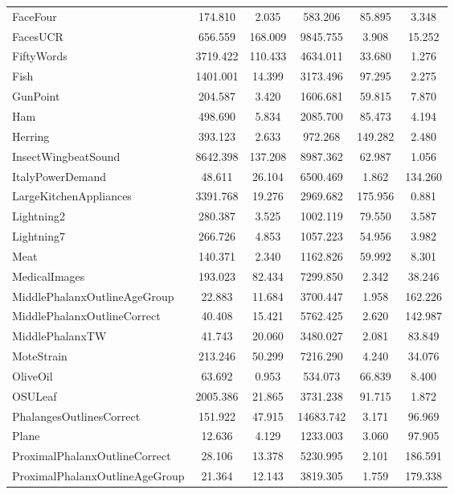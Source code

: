 \begin{table}[ht]
\begin{adjustbox}{width=0.7\textwidth,center}
\begin{tabular}{lccccc}
        FaceFour & 174.810 & 2.035 & 583.206 & 85.895 & 3.348 \\
        FacesUCR & 656.559 & 168.009 & 9845.755 & 3.908 & 15.252 \\
        FiftyWords & 3719.422 & 110.433 & 4634.011 & 33.680 & 1.276 \\
        Fish & 1401.001 & 14.399 & 3173.496 & 97.295 & 2.275 \\
        GunPoint & 204.587 & 3.420 & 1606.681 & 59.815 & 7.870 \\
        Ham & 498.690 & 5.834 & 2085.700 & 85.473 & 4.194 \\
        Herring & 393.123 & 2.633 & 972.268 & 149.282 & 2.480 \\
        InsectWingbeatSound & 8642.398 & 137.208 & 8987.362 & 62.987 & 1.056 \\
        ItalyPowerDemand & 48.611 & 26.104 & 6500.469 & 1.862 & 134.260 \\
        LargeKitchenAppliances & 3391.768 & 19.276 & 2969.682 & 175.956 & 0.881 \\
        Lightning2 & 280.387 & 3.525 & 1002.119 & 79.550 & 3.587 \\
        Lightning7 & 266.726 & 4.853 & 1057.223 & 54.956 & 3.982 \\
        Meat & 140.371 & 2.340 & 1162.826 & 59.992 & 8.301 \\
        MedicalImages & 193.023 & 82.434 & 7299.850 & 2.342 & 38.246 \\
        MiddlePhalanxOutlineAgeGroup & 22.883 & 11.684 & 3700.447 & 1.958 & 162.226 \\
        MiddlePhalanxOutlineCorrect & 40.408 & 15.421 & 5762.425 & 2.620 & 142.987 \\
        MiddlePhalanxTW & 41.743 & 20.060 & 3480.027 & 2.081 & 83.849 \\
        MoteStrain & 213.246 & 50.299 & 7216.290 & 4.240 & 34.076 \\
        OliveOil & 63.692 & 0.953 & 534.073 & 66.839 & 8.400 \\
        OSULeaf & 2005.386 & 21.865 & 3731.238 & 91.715 & 1.872 \\
        PhalangesOutlinesCorrect & 151.922 & 47.915 & 14683.742 & 3.171 & 96.969 \\
        Plane & 12.636 & 4.129 & 1233.003 & 3.060 & 97.905 \\
        ProximalPhalanxOutlineCorrect & 28.106 & 13.378 & 5230.995 & 2.101 & 186.591 \\
        ProximalPhalanxOutlineAgeGroup & 21.364 & 12.143 & 3819.305 & 1.759 & 179.338 \\

\end{tabular}
\end{adjustbox}
\end{table}
